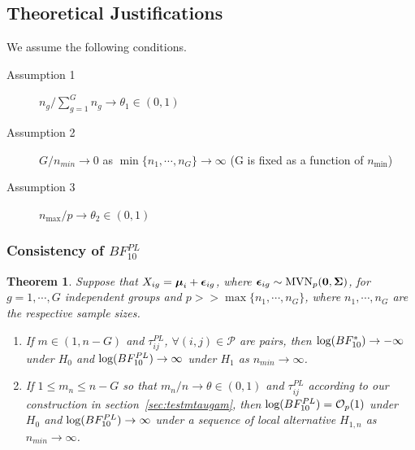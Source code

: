 \documentclass[times,sort&compress,3p]{elsarticle}
\theoremstyle{plain}%
\newtheorem{theorem}{Theorem}
\theoremstyle{definition}
\def\bzero{{\mathbf 0}}
\def\log{\hbox{log}}
\def\MVN{\hbox{MVN}}
\def\log{\hbox{log}}
\def\bzero{{\mathbf 0}}
\newcommand{\uepsilon}          {\mbox{\boldmath$\epsilon$}}
\newcommand{\umu}               {\mbox{\boldmath$\mu$}}
\newcommand{\uSigma}            {\mbox{\boldmath$\Sigma$}}
\begin{document}
\subsection{Theoretical Justifications} 
We assume the following conditions.
\begin{description}
  \item[Assumption 1] $n_g /\sum_{g=1}^{G}n_g \rightarrow \theta_1 \in (0, 1)$
  \item[Assumption 2] $G / n_{min} \rightarrow 0$ as $\min\{ n_1, \cdots, n_G \} \rightarrow \infty$ (G is fixed as a function of $n_{\min}$)
  \item[Assumption 3] $n_{\max}/p \rightarrow \theta_2 \in (0, 1)$ 
\end{description}

\subsubsection{Consistency of $BF_{10}^{PL}$}
\begin{theorem}\label{Thrm1}
Suppose that $X_{ig} = \umu_i + \uepsilon_{ig}$, where $\uepsilon_{ig} \sim \MVN_{p}(\bzero, \uSigma)$, for $g = 1, \cdots, G$ independent groups and $p >> \max\{n_1, \cdots, n_{G}\}$, where $n_1, \cdots, n_{G}$ are the respective sample sizes. %
\begin{enumerate}
    \item If $m \in (1, n - G)$ and $\tau^{PL}_{ij}$, $\forall (i,j) \in \mathcal{P}$ are pairs, then $\log(BF^{*}_{10}) \rightarrow -\infty$ under $H_0$ and $\log(BF^{PL}_{10}) \rightarrow \infty$ under $H_1$ as $n_{min} \rightarrow \infty$. 
    \item If $1 \leq m_n \leq n - G$ so that $m_n/n \rightarrow \theta \in (0, 1)$ and $\tau^{PL}_{ij}$ according to our construction in section~\ref{sec:testmtaugam}, then $\log(BF^{PL}_{10}) = \mathcal{O}_{p}(1)$ under $H_0$ and $\log(BF^{PL}_{10}) \rightarrow \infty$ under a sequence of local alternative $H_{1,n}$ as $n_{min} \rightarrow \infty$.
\end{enumerate}
\end{theorem}
\end{document}
